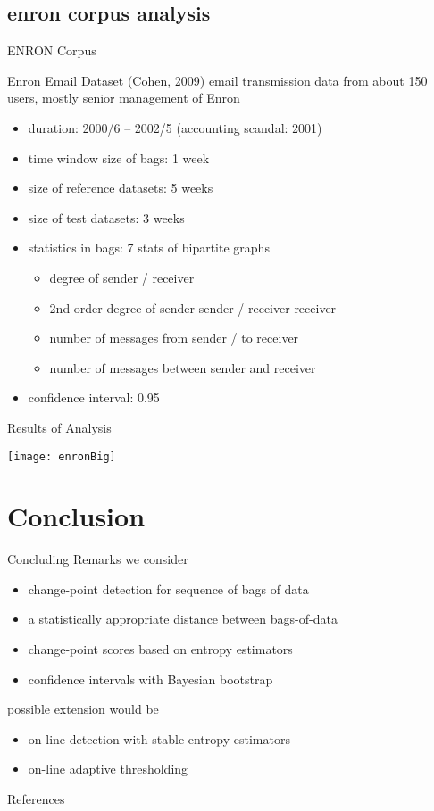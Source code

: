 \documentclass[fleqn,aspectratio=1610]{beamer}
\begin{document}
\subsection{enron corpus analysis}
\label{sec:orgfe13fe5}
\begin{frame}[label={sec:orgde3a921}]{ENRON Corpus}
\begin{exampleblock}{Enron Email Dataset (Cohen, 2009)}\label{sec:org070c4f2}
email transmission data from about 150 users,
mostly senior management of Enron
\end{exampleblock}
\begin{itemize}
\item duration: 2000/6 -- 2002/5 (accounting scandal: 2001)
\item time window size of bags: 1 week
\item size of reference datasets: 5 weeks
\item size of test datasets: 3 weeks
\item statistics in bags: 7 stats of bipartite graphs
\begin{itemize}
\item degree of sender / receiver
\item 2nd order degree of sender-sender / receiver-receiver
\item number of messages from sender / to receiver
\item number of messages between sender and receiver
\end{itemize}
\item confidence interval: 0.95
\end{itemize}
\end{frame}

\begin{frame}[label={sec:org0eabc0f}]{Results of Analysis}
\begin{center}
\texttt{[image: enronBig]}
\end{center}
\nocite{Sun_etal2007kdd}
\end{frame}


\section{Conclusion}
\label{sec:org4a7f2de}
\begin{frame}[label={sec:orgcdb8128}]{Concluding Remarks}
we consider
\begin{itemize}
\item change-point detection for sequence of bags of data
\item a statistically appropriate distance between bags-of-data
\item change-point scores based on entropy estimators
\item confidence intervals with Bayesian bootstrap
\end{itemize}
possible extension would be
\begin{itemize}
\item on-line detection with stable entropy estimators
\item on-line adaptive thresholding
\end{itemize}
\end{frame}

\begin{frame}[allowframebreaks]{References}
\printbibliography[heading=none]
\end{frame}
\end{document}
